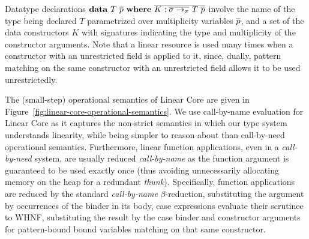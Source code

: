 \documentclass[acmsmall,review,anonymous]{acmart}
\begin{document}

Datatype declarations $\mathbf{data}~T~\overline{p}~\mathbf{where}~\overline{K:\overline{\sigma
\to_\pi}~T~\overline{p} }$ involve the name of the type being declared $T$
parametrized over multiplicity variables $\overline{p}$, and a set of the data
constructors $K$ with signatures indicating the type and multiplicity of the
constructor arguments. Note that a linear resource is used many times when a
constructor with an unrestricted field is applied to it, since, dually, pattern
matching on the same constructor with an unrestricted field allows it to be
used unrestrictedly.

\SyntaxFull


The (small-step) operational semantics of Linear Core are given in
Figure~\ref{fig:linear-core-operational-semantics}. We use call-by-name
evaluation for Linear Core as it captures the non-strict semantics in which
our type system understands linearity, while being simpler to reason about than
call-by-need operational semantics.
Furthermore, linear function applications, even in a \emph{call-by-need} system, are
usually reduced \emph{call-by-name} as the function argument is guaranteed to
be used exactly once (thus avoiding unnecessarily allocating memory on the heap
for a redundant \emph{thunk}).
%
Specifically, function applications are reduced by the standard
\emph{call-by-name} $\beta$-reduction, substituting the argument by
occurrences of the binder in its body, case expressions evaluate their
scrutinee to WHNF, substituting the result by the case binder and constructor
arguments for pattern-bound bound variables matching on that same constructor.
\end{document}
